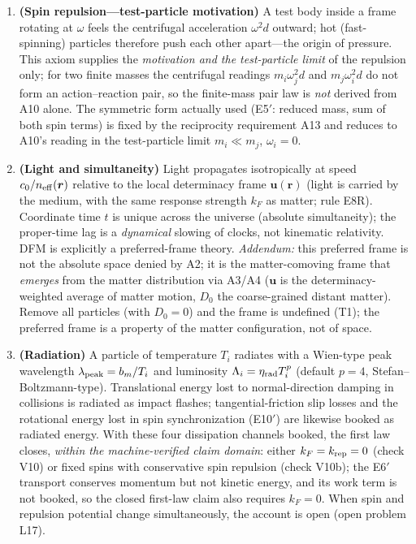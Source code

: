 \documentclass[aps,reprint,amsmath,amssymb,nofootinbib,superscriptaddress,floatfix]{revtex4-2}
\newcommand{\vect}[1]{\bm{#1}}
\newcommand{\Dz}{D_0}
\begin{document}
\begin{enumerate}
\item[A10.]{\bf (Spin repulsion---test-particle motivation)} A test
body inside a frame rotating at $\omega$ feels the centrifugal
acceleration $\omega^2 d$ outward; hot (fast-spinning) particles
therefore push each other apart---the origin of pressure.
This axiom supplies the \emph{motivation and the test-particle limit}
of the repulsion only; for two finite masses the centrifugal readings
$m_i\omega_j^2 d$ and $m_j\omega_i^2 d$ do not form an
action--reaction pair, so the finite-mass pair law is \emph{not}
derived from A10 alone.
The symmetric form actually used (E5$'$: reduced mass, sum of both
spin terms) is fixed by the reciprocity requirement A13 and reduces to
A10's reading in the test-particle limit
$m_i \ll m_j$, $\omega_i = 0$.

\item[A11.]{\bf (Light and simultaneity)} Light propagates
isotropically at speed $c_0/n_{\rm eff}(\vect{r})$ relative to the
local determinacy frame $\vect{u}(\vect{r})$ (light is carried by the
medium, with the same response strength $k_F$ as matter; rule E8R).
Coordinate time $t$ is unique across the universe (absolute
simultaneity); the proper-time lag is a \emph{dynamical} slowing of
clocks, not kinematic relativity.
DFM is explicitly a preferred-frame theory.
\emph{Addendum:} this preferred frame is not the absolute space denied
by A2; it is the matter-comoving frame that \emph{emerges} from the
matter distribution via A3/A4 ($\vect{u}$ is the determinacy-weighted
average of matter motion, $\Dz$ the coarse-grained distant matter).
Remove all particles (with $\Dz = 0$) and the frame is undefined (T1);
the preferred frame is a property of the matter configuration, not of
space.

\item[A12$'$.]{\bf (Radiation)} A particle of temperature $T_i$
radiates with a Wien-type peak wavelength
$\lambda_{\rm peak} = b_m/T_i$ and luminosity
$\Lambda_i = \eta_{\rm rad}T_i^p$ (default $p = 4$,
Stefan--Boltzmann-type).
Translational energy lost to normal-direction damping in collisions is
radiated as impact flashes; tangential-friction slip losses and the
rotational energy lost in spin synchronization (E10$'$) are likewise
booked as radiated energy.
With these four dissipation channels booked, the first law closes,
\emph{within the machine-verified claim domain}: either
$k_F = k_{\rm rep} = 0$ (check V10) or fixed spins with conservative
spin repulsion (check V10b); the E6$'$ transport conserves momentum
but not kinetic energy, and its work term is not booked, so the closed
first-law claim also requires $k_F = 0$.
When spin and repulsion potential change
simultaneously, the account is open (open problem L17).


\end{enumerate}
\end{document}
